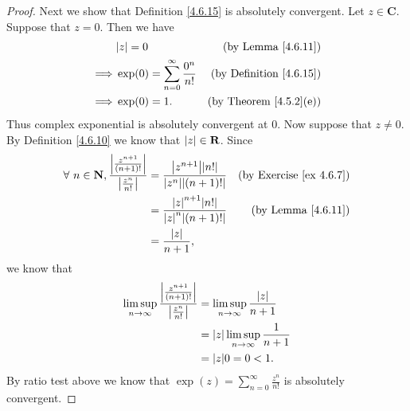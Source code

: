 \begin{proof}
    Next we show that Definition \ref{4.6.15} is absolutely convergent.
    Let \(z \in \mathbf{C}\).
    Suppose that \(z = 0\).
    Then we have
    \begin{align*}
                 & \abs*{z} = 0                                 & \text{(by Lemma \ref{4.6.11})}      \\
        \implies & \exp(0) = \sum_{n = 0}^\infty \frac{0^n}{n!} & \text{(by Definition \ref{4.6.15})} \\
        \implies & \exp(0) = 1.                                 & \text{(by Theorem \ref{4.5.2}(e))}
    \end{align*}
    Thus complex exponential is absolutely convergent at \(0\).
    Now suppose that \(z \neq 0\).
    By Definition \ref{4.6.10} we know that \(\abs*{z} \in \mathbf{R}\).
    Since
    \begin{align*}
        \forall\ n \in \mathbf{N}, \frac{\abs*{\frac{z^{n + 1}}{(n + 1)!}}}{\abs*{\frac{z^n}{n!}}} & = \frac{\abs*{z^{n + 1}} \abs*{n!}}{\abs*{z^n} \abs*{(n + 1)!}} & \text{(by Exercise \ref{ex 4.6.7})} \\
                                                                                                   & = \frac{\abs*{z}^{n + 1} \abs*{n!}}{\abs*{z}^n \abs*{(n + 1)!}} & \text{(by Lemma \ref{4.6.11})}      \\
                                                                                                   & = \frac{\abs*{z}}{n + 1},
    \end{align*}
    we know that
    \begin{align*}
        \limsup_{n \to \infty} \frac{\abs*{\frac{z^{n + 1}}{(n + 1)!}}}{\abs*{\frac{z^n}{n!}}} & = \limsup_{n \to \infty} \frac{\abs*{z}}{n + 1}   \\
                                                                                               & = \abs*{z} \limsup_{n \to \infty} \frac{1}{n + 1} \\
                                                                                               & = \abs*{z} 0 = 0 < 1.
    \end{align*}
    By ratio test above we know that \(\exp(z) = \sum_{n = 0}^\infty \frac{z^n}{n!}\) is absolutely convergent.


\end{proof}
